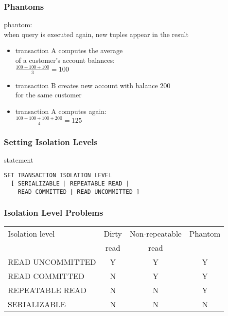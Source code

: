 \documentclass[dvipsnames]{beamer}
\theoremstyle{plain}
\begin{document}
\begin{frame}
  \frametitle{Phantoms}

  \begin{definition}
    \alert{phantom}:\\
      when query is executed again, new tuples appear in the result
  \end{definition}

  \pause
  \begin{example}
    \begin{itemize}
      \item transaction A computes the average\\
	of a customer's account balances:\\
        $\frac{100+100+100}{3}=100$

      \pause
      \item transaction B creates new account with balance $200$\\
	for the same customer
      \item transaction A computes again:\\
        $\frac{100+100+100+200}{4}=125$
    \end{itemize}
  \end{example}
\end{frame}

\begin{frame}[fragile]
  \frametitle{Setting Isolation Levels}

  \begin{block}{statement}
    \begin{lstlisting}
SET TRANSACTION ISOLATION LEVEL
  [ SERIALIZABLE | REPEATABLE READ |
    READ COMMITTED | READ UNCOMMITTED ]
    \end{lstlisting}
  \end{block}
\end{frame}

\begin{frame}[fragile]
  \frametitle{Isolation Level Problems}

  \begin{table}
    \begin{tabular}{|l||c|c|c|}\hline
Isolation level  & Dirty & Non-repeatable & Phantom\\
                 & read  & read           &        \\\hline\hline
READ UNCOMMITTED & Y     & Y              & Y      \\\hline
READ COMMITTED   & N     & Y              & Y      \\\hline
REPEATABLE READ  & N     & N              & Y      \\\hline
SERIALIZABLE     & N     & N              & N      \\\hline
    \end{tabular}
  \end{table}
\end{frame}
\end{document}
